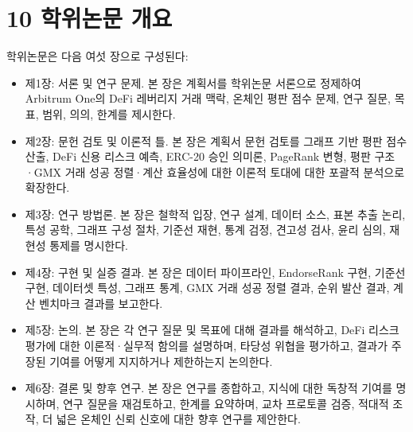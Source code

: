 \clearpage
{}
\section*{10 \textbf{학위논문 개요}}
\label{sec:dissertationthesis-outline}

학위논문은 다음 여섯 장으로 구성된다:


\begin{itemize}
\item[\textendash] 제1장: 서론 및 연구 문제. 본 장은 계획서를 학위논문 서론으로 정제하여 Arbitrum One의 DeFi 레버리지 거래 맥락, 온체인 평판 점수 문제, 연구 질문, 목표, 범위, 의의, 한계를 제시한다.
\item[\textendash] 제2장: 문헌 검토 및 이론적 틀. 본 장은 계획서 문헌 검토를 그래프 기반 평판 점수 산출, DeFi 신용 리스크 예측, ERC-20 승인 의미론, PageRank 변형, 평판 구조·GMX 거래 성공 정렬·계산 효율성에 대한 이론적 토대에 대한 포괄적 분석으로 확장한다.
\item[\textendash] 제3장: 연구 방법론. 본 장은 철학적 입장, 연구 설계, 데이터 소스, 표본 추출 논리, 특성 공학, 그래프 구성 절차, 기준선 재현, 통계 검정, 견고성 검사, 윤리 심의, 재현성 통제를 명시한다.
\item[\textendash] 제4장: 구현 및 실증 결과. 본 장은 데이터 파이프라인, EndorseRank 구현, 기준선 구현, 데이터셋 특성, 그래프 통계, GMX 거래 성공 정렬 결과, 순위 발산 결과, 계산 벤치마크 결과를 보고한다.
\item[\textendash] 제5장: 논의. 본 장은 각 연구 질문 및 목표에 대해 결과를 해석하고, DeFi 리스크 평가에 대한 이론적·실무적 함의를 설명하며, 타당성 위협을 평가하고, 결과가 주장된 기여를 어떻게 지지하거나 제한하는지 논의한다.
\item[\textendash] 제6장: 결론 및 향후 연구. 본 장은 연구를 종합하고, 지식에 대한 독창적 기여를 명시하며, 연구 질문을 재검토하고, 한계를 요약하며, 교차 프로토콜 검증, 적대적 조작, 더 넓은 온체인 신뢰 신호에 대한 향후 연구를 제안한다.
\end{itemize}
